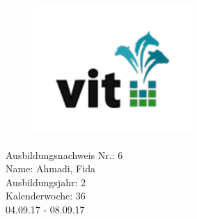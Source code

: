 \documentclass[a4paper, 14pt]{scrbook}
\begin{document}
 
\pagestyle{empty} %
\begin{figure}[t]
\hspace{13.0cm}
\includegraphics[height=50mm, width=60mm]{vitLogo.jpg}
\end{figure}

Ausbildungsnachweis Nr.: 6 \\
Name: Ahmadi, Fida  \\ 
Ausbildungsjahr: 2 \\
Kalenderwoche:  36 \\ 
04.09.17 - 08.09.17\\
\date{\specialdate\today}
\end{document}
